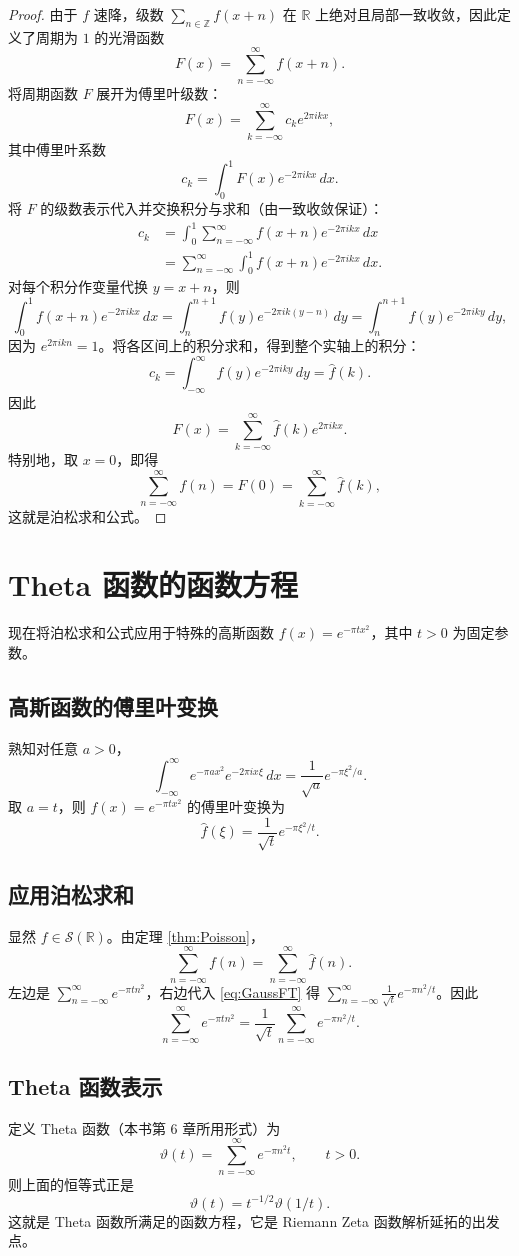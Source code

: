\documentclass[UTF8]{ctexart}
\numberwithin{equation}{section}
\newcommand{\RR}{\mathbb{R}}
\newcommand{\ZZ}{\mathbb{Z}}
\begin{document}
\begin{proof}
由于 \(f\) 速降，级数 \(\sum_{n\in\ZZ} f(x+n)\) 在 \(\RR\) 上绝对且局部一致收敛，因此定义了周期为 \(1\) 的光滑函数
\[
F(x) = \sum_{n=-\infty}^{\infty} f(x+n).
\]
将周期函数 \(F\) 展开为傅里叶级数：
\[
F(x) = \sum_{k=-\infty}^{\infty} c_k e^{2\pi i k x},
\]
其中傅里叶系数
\[
c_k = \int_0^1 F(x) e^{-2\pi i k x}\,dx .
\]
将 \(F\) 的级数表示代入并交换积分与求和（由一致收敛保证）：
\begin{align*}
c_k &= \int_0^1 \sum_{n=-\infty}^{\infty} f(x+n) e^{-2\pi i k x}\,dx \\
&= \sum_{n=-\infty}^{\infty} \int_0^1 f(x+n) e^{-2\pi i k x}\,dx .
\end{align*}
对每个积分作变量代换 \(y = x+n\)，则
\[
\int_0^1 f(x+n) e^{-2\pi i k x}\,dx = \int_n^{n+1} f(y) e^{-2\pi i k (y-n)}\,dy = \int_n^{n+1} f(y) e^{-2\pi i k y}\,dy ,
\]
因为 \(e^{2\pi i k n}=1\)。将各区间上的积分求和，得到整个实轴上的积分：
\[
c_k = \int_{-\infty}^{\infty} f(y) e^{-2\pi i k y}\,dy = \hat{f}(k).
\]
因此
\[
F(x) = \sum_{k=-\infty}^{\infty} \hat{f}(k) e^{2\pi i k x}.
\]
特别地，取 \(x=0\)，即得
\[
\sum_{n=-\infty}^{\infty} f(n) = F(0) = \sum_{k=-\infty}^{\infty} \hat{f}(k),
\]
这就是泊松求和公式。
\end{proof}

\section{Theta 函数的函数方程}

现在将泊松求和公式应用于特殊的高斯函数 \(f(x) = e^{-\pi t x^2}\)，其中 \(t>0\) 为固定参数。

\subsection*{高斯函数的傅里叶变换}

熟知对任意 \(a>0\)，
\[
\int_{-\infty}^{\infty} e^{-\pi a x^2} e^{-2\pi i x\xi}\,dx = \frac{1}{\sqrt{a}} e^{-\pi \xi^2 / a}.
\]
取 \(a = t\)，则 \(f(x) = e^{-\pi t x^2}\) 的傅里叶变换为
\begin{equation}\label{eq:GaussFT}
\hat{f}(\xi) = \frac{1}{\sqrt{t}} e^{-\pi \xi^2 / t}.
\end{equation}

\subsection*{应用泊松求和}

显然 \(f\in\mathcal{S}(\RR)\)。由定理 \ref{thm:Poisson}，
\[
\sum_{n=-\infty}^{\infty} f(n) = \sum_{n=-\infty}^{\infty} \hat{f}(n).
\]
左边是 \(\sum_{n=-\infty}^{\infty} e^{-\pi t n^2}\)，右边代入 \eqref{eq:GaussFT} 得 \(\sum_{n=-\infty}^{\infty} \frac{1}{\sqrt{t}} e^{-\pi n^2 / t}\)。因此
\[
\sum_{n=-\infty}^{\infty} e^{-\pi t n^2} = \frac{1}{\sqrt{t}} \sum_{n=-\infty}^{\infty} e^{-\pi n^2 / t}.
\]

\subsection*{Theta 函数表示}

定义 Theta 函数（本书第 6 章所用形式）为
\[
\vartheta(t) = \sum_{n=-\infty}^{\infty} e^{-\pi n^2 t}, \qquad t>0.
\]
则上面的恒等式正是
\begin{equation}\label{eq:ThetaFuncEq}
\boxed{\vartheta(t) = t^{-1/2} \vartheta(1/t)} .
\end{equation}
这就是 Theta 函数所满足的函数方程，它是 Riemann Zeta 函数解析延拓的出发点。
\end{document}
